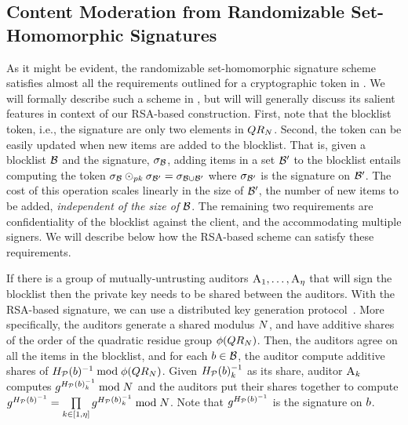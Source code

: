 \subsection{Content Moderation from Randomizable Set-Homomorphic Signatures}
%
As it might be evident, the randomizable set-homomorphic signature scheme satisfies almost all the 
requirements outlined for a cryptographic token in . We will formally describe such 
a scheme in , but will will generally discuss its salient features in context of our 
RSA-based construction. First, note that the blocklist token, i.e., the signature are only two elements 
in $QR_{N}$. Second, the token can be easily updated when new items are added to the blocklist. 
That is, given a blocklist $\blocklist$ and the signature, $\genericSig[\blocklist]$, adding items in a set 
$\blocklist'$ to the blocklist entails computing the token $\genericSig[\blocklist] 
\sigHomomorphism[\pubKey] \genericSig[\blocklist'] = \genericSig[\blocklist \cup \blocklist']$ where 
$\genericSig[\blocklist']$ is the signature on $\blocklist'$. The cost of this operation scales linearly in 
the size of $\blocklist'$, the number of new items to be added, \textit{independent of the size of 
$\blocklist$}.  The remaining two requirements are confidentiality of the blocklist 
against the client, and the accommodating multiple signers. We will describe below how the 
RSA-based scheme can satisfy these requirements. 


%
If there is a group of mutually-untrusting auditors $\auditor[1], \dots, \auditor[\numAuditors]$ that 
will sign the blocklist then the private key 
needs to be shared between the auditors. With the RSA-based signature, we can use a
distributed key generation protocol~\cite{}. More specifically, the auditors generate a shared 
modulus $N$, and have 
additive shares of the order of the quadratic residue group $\phi(QR_{N})$. Then, the auditors 
agree on all the items in the blocklist, and for each $\genericBlocklistElmt \in \blocklist$, the auditor 
compute additive shares of $\primeRO(\genericBlocklistElmt)^{-1} \bmod \orderFn(\qrGroup)$. 
Given 
$\primeRO(\genericBlocklistElmt)^{-1}_{\auditorIdx}$ as its share, auditor $\auditor[\auditorIdx]$ 
computes 
$\qrGen^{\primeRO(\genericBlocklistElmt)^{-1}_{\auditorIdx}} \bmod \rsaMod$ and the auditors put 
their shares 
together to compute $\qrGen^{\primeRO(\genericBlocklistElmt)^{-1}} = \prod\limits_{\auditorIdx \in 
	[1, 
	\numAuditors]} \qrGen^{\primeRO(\genericBlocklistElmt)^{-1}_{\auditorIdx}} \bmod \rsaMod$. Note 
that $\qrGen^{\primeRO(\genericBlocklistElmt)^{-1}}$ is the signature on $\genericBlocklistElmt$.

